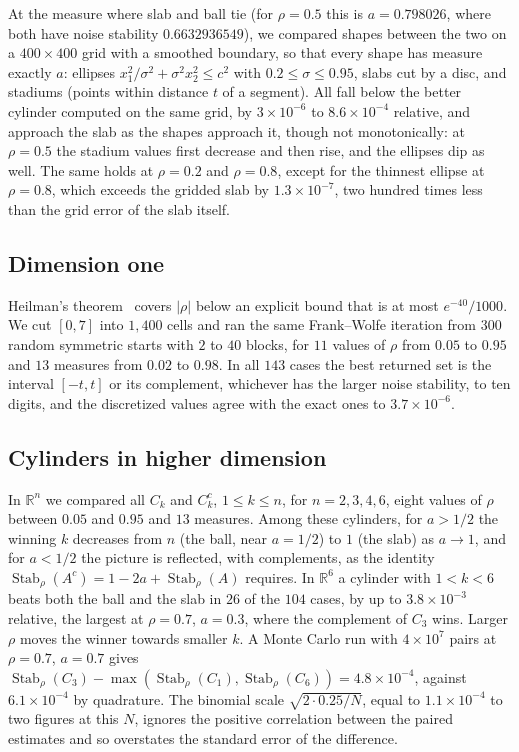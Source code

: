 \documentclass[11pt]{amsart}
\theoremstyle{remark}
\newcommand{\R}{\mathbb{R}}
\newcommand{\Stab}{\operatorname{Stab}_\rho}
\begin{document}
At the measure where slab and ball tie (for $\rho=0.5$ this is $a=0.798026$, where both have noise stability
$0.6632936549$), we compared shapes between the two on a $400\times400$ grid with a smoothed boundary, so that every
shape has measure exactly $a$: ellipses $x_1^2/\sigma^2+\sigma^2x_2^2\le c^2$ with $0.2\le\sigma\le0.95$, slabs cut by a
disc, and stadiums (points within distance $t$ of a segment). All fall below the better cylinder computed on the same
grid, by $3\times10^{-6}$ to $8.6\times10^{-4}$ relative, and approach the slab as the shapes approach it, though not
monotonically: at $\rho=0.5$ the stadium values first decrease and then rise, and the ellipses dip as well. The same holds at
$\rho=0.2$ and $\rho=0.8$, except for the thinnest ellipse at $\rho=0.8$, which exceeds the gridded slab by
$1.3\times10^{-7}$, two hundred times less than the grid error of the slab itself.

\subsection*{Dimension one}
Heilman's theorem~\cite[Theorem~1.5]{H1} covers $|\rho|$ below an explicit bound that is at most $e^{-40}/1000$. We
cut $[0,7]$ into $1{,}400$ cells and ran the same Frank--Wolfe iteration from $300$ random symmetric starts with $2$
to $40$ blocks, for $11$ values of $\rho$ from $0.05$ to $0.95$ and $13$ measures from $0.02$ to $0.98$. In all $143$
cases the best returned set is the interval $[-t,t]$ or its complement, whichever has the larger noise stability, to
ten digits, and the discretized values agree with the exact ones to $3.7\times10^{-6}$.

\subsection*{Cylinders in higher dimension}
In $\R^n$ we compared all $C_k$ and $C_k^c$, $1\le k\le n$, for $n=2,3,4,6$, eight values of $\rho$ between $0.05$ and
$0.95$ and $13$ measures. Among these cylinders, for $a>1/2$ the winning $k$ decreases from $n$ (the ball, near $a=1/2$) to $1$ (the slab) as
$a\to1$, and for $a<1/2$ the picture is reflected, with complements, as the identity $\Stab(A^c)=1-2a+\Stab(A)$
requires. In $\R^6$ a cylinder with $1<k<6$ beats both the ball and the slab in $26$ of the $104$ cases, by up to
$3.8\times10^{-3}$ relative, the largest at $\rho=0.7$, $a=0.3$, where the complement of $C_3$ wins. Larger $\rho$
moves the winner towards smaller $k$. A Monte Carlo run with $4\times10^7$ pairs at $\rho=0.7$, $a=0.7$ gives
$\Stab(C_3)-\max(\Stab(C_1),\Stab(C_6))=4.8\times10^{-4}$, against $6.1\times10^{-4}$ by quadrature. The binomial
scale $\sqrt{2\cdot0.25/N}$, equal to $1.1\times10^{-4}$ to two figures at this $N$, ignores the positive correlation between the paired estimates and
so overstates the standard error of the difference.
\end{document}
